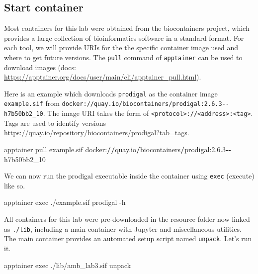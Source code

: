 \documentclass[
]{book}
\newenvironment{Shaded}{\begin{snugshade}}{\end{snugshade}}
\newcommand{\AttributeTok}[1]{\textcolor[rgb]{0.13,0.29,0.53}{#1}}
\newcommand{\ExtensionTok}[1]{#1}
\newcommand{\FloatTok}[1]{\textcolor[rgb]{0.00,0.00,0.81}{#1}}
\newcommand{\NormalTok}[1]{#1}
\newcommand{\OperatorTok}[1]{\textcolor[rgb]{0.81,0.36,0.00}{\textbf{#1}}}
\begin{document}
\subsection{Start container}\label{start-container}

Most containers for this lab were obtained from the biocontainers project, which provides a large collection of bioinformatics software in a standard format.
For each tool, we will provide URIs for the the specific container image used and where to get future versions.
The \texttt{pull} command of \texttt{apptainer} can be used to download images (docs: \url{https://apptainer.org/docs/user/main/cli/apptainer_pull.html}).

Here is an example which downloads \texttt{prodigal} as the container image \texttt{example.sif} from \texttt{docker://quay.io/biocontainers/prodigal:2.6.3-\/-h7b50bb2\_10}.
The image URI takes the form of \texttt{\textless{}protocol\textgreater{}://\textless{}address\textgreater{}:\textless{}tag\textgreater{}}. Tags are used to identify versions \url{https://quay.io/repository/biocontainers/prodigal?tab=tags}.

\begin{Shaded}
\begin{Highlighting}[numbers=left,,]
\NormalTok{apptainer pull example.sif docker:}\OperatorTok{//}\NormalTok{quay.io}\OperatorTok{/}\NormalTok{biocontainers}\OperatorTok{/}\NormalTok{prodigal:}\FloatTok{2.6.3}\OperatorTok{{-}{-}}\NormalTok{h7b50bb2\_10}
\end{Highlighting}
\end{Shaded}

We can now run the prodigal executable inside the container using \texttt{exec} (execute) like so.

\begin{Shaded}
\begin{Highlighting}[]
\ExtensionTok{apptainer}\NormalTok{ exec ./example.sif prodigal }\AttributeTok{{-}h}
\end{Highlighting}
\end{Shaded}

All containers for this lab were pre-downloaded in the resource folder now linked as \texttt{./lib}, including a main container with Jupyter and miscellaneous utilities.
The main container provides an automated setup script named \texttt{unpack}. Let's run it.

\begin{Shaded}
\begin{Highlighting}[]
\ExtensionTok{apptainer}\NormalTok{ exec ./lib/amb\_lab3.sif unpack}
\end{Highlighting}
\end{Shaded}
\end{document}
